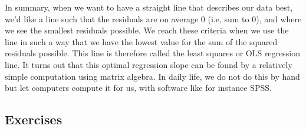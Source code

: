 \documentclass[]{report}\usepackage[]{graphicx}\usepackage[]{color}
\begin{document}
In summary, when we want to have a straight line that describes our data best, we'd like a line such that the residuals are on average 0 (i.e, sum to 0), and where we see the smallest residuals possible. We reach these criteria when we use the line in such a way that we have the lowest value for the sum of the squared residuals possible. This line is therefore called the least squares or OLS regression line. It turns out that this optimal regression slope can be found by a relatively simple computation using matrix algebra. In daily life, we do not do this by hand but let computers compute it for us, with software like for instance SPSS.


\subsection{Exercises}
\end{document}
